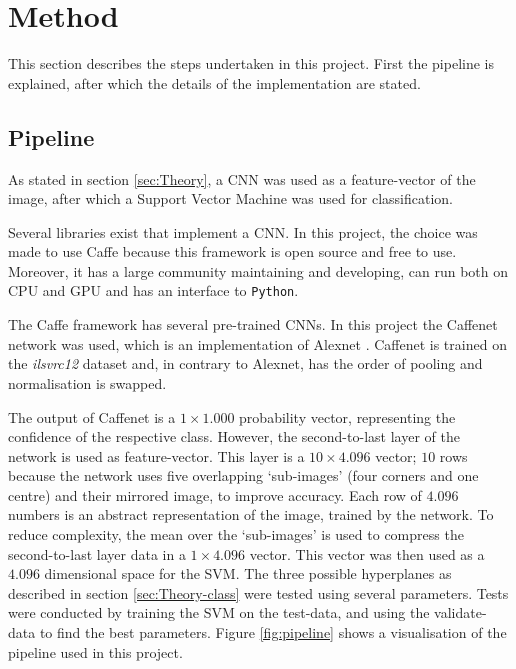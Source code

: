 \section{Method}
\label{sec:Method}
This section describes the steps undertaken in this project.
First the pipeline is explained, after which the details of the implementation are stated.

\subsection{Pipeline}
\label{sec:Method-pipeline}
As stated in section \ref{sec:Theory}, a CNN was used as a feature-vector of the image, after which a Support Vector Machine was used for classification.

Several libraries exist that implement a CNN.
In this project, the choice was made to use Caffe \citep{jia2014caffe} because this framework is open source and free to use.
Moreover, it has a large community maintaining and developing, can run both on CPU and GPU and has an interface to \texttt{Python}.

The Caffe framework has several pre-trained CNNs.
In this project the Caffenet network was used, which is an implementation of Alexnet \citep{krizhevsky2012imagenet}. Caffenet is trained on the \textit{ilsvrc12} dataset and, in contrary to Alexnet, has the order of pooling and normalisation is swapped.

The output of Caffenet is a $1\times1.000$ probability vector, representing the confidence of the respective class.
However, the second-to-last layer of the network is used as feature-vector. This layer is a $10\times4.096$ vector; $10$ rows because the network uses five overlapping `sub-images' (four corners and one centre) and their mirrored image, to improve accuracy.
Each row of $4.096$ numbers is an abstract representation of the image, trained by the network.
To reduce complexity, the mean over the `sub-images' is used to compress the second-to-last layer data in a $1\times4.096$ vector.
This vector was then used as a $4.096$ dimensional space for the SVM.
The three possible hyperplanes as described in section \ref{sec:Theory-class} were tested using several parameters.
Tests were conducted by training the SVM on the test-data, and using the validate-data to find the best parameters.
Figure \ref{fig:pipeline} shows a visualisation of the pipeline used in this project.

